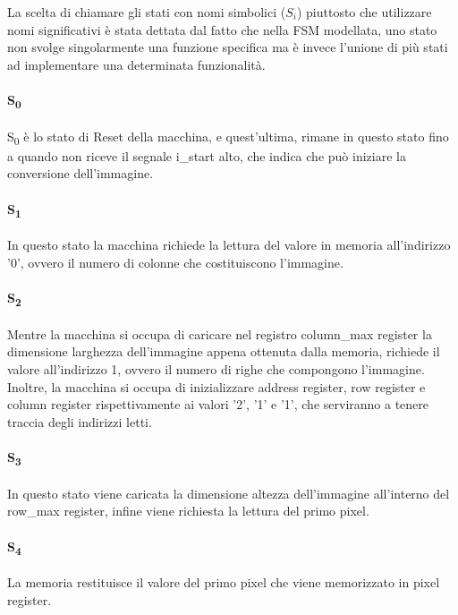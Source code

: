 La scelta di chiamare gli stati con nomi simbolici ($S_i$) piuttosto che utilizzare nomi significativi è stata dettata dal fatto che nella FSM modellata, uno stato non svolge singolarmente una funzione specifica ma è invece l'unione di più stati ad implementare una determinata funzionalità.

\paragraph{S\textsubscript{0}}
S\textsubscript{0} è lo stato di Reset della macchina, e quest'ultima, rimane in questo stato fino a quando non riceve il segnale i\_start alto, che indica che può iniziare la conversione dell'immagine.
\paragraph{S\textsubscript{1}}
In questo stato la macchina richiede la lettura del valore in memoria all'indirizzo '0', ovvero il numero di colonne che costituiscono l'immagine.
\paragraph{S\textsubscript{2}}
Mentre la macchina si occupa di caricare nel registro column\_max register la dimensione larghezza dell'immagine appena ottenuta dalla memoria, richiede il valore all'indirizzo 1, ovvero il numero di righe che compongono l'immagine. Inoltre, la macchina si occupa di inizializzare address register, row register e column register rispettivamente ai valori '2', '1' e '1', che serviranno a tenere traccia degli indirizzi letti.
\paragraph{S\textsubscript{3}}
In questo stato viene caricata la dimensione altezza dell'immagine all'interno del row\_max register, infine viene richiesta la lettura del primo pixel.
\paragraph{S\textsubscript{4}}
La memoria restituisce il valore del primo pixel che viene memorizzato in pixel register.
